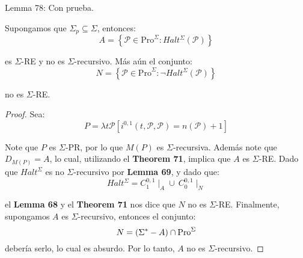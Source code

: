   Lemma 78: Con prueba.
  \begin{lemma}
    \PN Supongamos que $\Sigma_{p} \subseteq \Sigma$, entonces:
    \[
      A = \left\{\mathcal{P} \in \mathrm{Pro}^{\Sigma}: Halt^{\Sigma}(\mathcal{P})\right\}
    \]

    \PN es $\Sigma$-RE y no es $\Sigma$-recursivo. Más aún el conjunto:
    \[
      N = \left\{\mathcal{P} \in \mathrm{Pro}^{\Sigma}: \lnot Halt^{\Sigma}(\mathcal{P})\right\}
    \]

    \PN no es $\Sigma$-RE.
  \end{lemma}
  \begin{proof}
    \PN Sea:
    \[
      P = \lambda t\mathcal{P}\left[i^{0,1}(t,\mathcal{P},\mathcal{P}) = n(\mathcal{P}) + 1\right]
    \]

    \PN Note que $P$ es $\Sigma$-PR, por lo que $M(P)$ es $\Sigma$-recursiva. Además note que $D_{M(P)}=A$, lo cual,
    utilizando el \textbf{Theorem 71}, implica que $A$ es $\Sigma$-RE. Dado que $Halt^{\Sigma}$ es no $\Sigma$-recursivo
    por \textbf{Lemma 69}, y dado que:
    \[
      Halt^{\Sigma} = C_{1}^{0,1}\mid_{A} \cup \ C_{0}^{0,1}\mid_{N}
    \]

    \PN el \textbf{Lemma 68} y el \textbf{Theorem 71} nos dice que $N$ no es $\Sigma$-RE. Finalmente, supongamos $A$ es
    $\Sigma$-recursivo, entonces el conjunto:
    \[
      N = \left(\Sigma^{\ast}-A\right) \cap \mathrm{Pro}^{\Sigma}
    \]
    \PN debería serlo, lo cual es absurdo. Por lo tanto, $A$ no es $\Sigma$-recursivo.
  \end{proof}

